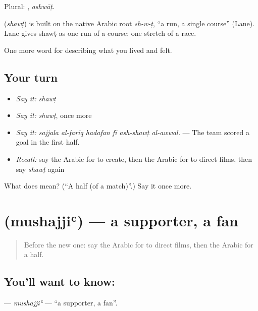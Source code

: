 Plural: , \emph{ashwāṭ}.

\begin{cousinweb}
\textbf{} (\emph{shawṭ}) is built on the native Arabic root \emph{sh-w-ṭ}, \textquotedblleft{}a run, a single course\textquotedblright{} (Lane). Lane gives shawṭ as one run of a course: one stretch of a race.
\end{cousinweb}

\begin{grammarlens}[title={What you've built}]
One more word for describing what you lived and felt.
\end{grammarlens}

\subsection*{Your turn}
\begin{itemize}
\raggedright
  \item \emph{Say it:} \emph{shawṭ}
  \item \emph{Say it:} \emph{shawṭ}, once more
  \item \emph{Say it:} \emph{sajjala al-farīq hadafan fī ash-shawṭ al-awwal.} — The team scored a goal in the first half.
  \item \emph{Recall:} say the Arabic for to create, then the Arabic for to direct films, then say \emph{shawṭ} again
\end{itemize}

\begin{tcolorbox}[breakable,colback=teal!4,colframe=teal!35!black,title={Before you move on}]
What does  mean? (\textquotedblleft{}A half (of a match)\textquotedblright{}.) Say it once more.
\end{tcolorbox}
\section[\texorpdfstring{\ar{مشجع} (mushajjiʿ)}{مشجع (mushajjiʿ)}]{ (mushajjiʿ) — a supporter, a fan}

\label{lesson:AR-C546-mushajji}



\begin{quote}
Before the new one: say the Arabic for to direct films, then the Arabic for a half.
\end{quote}

\subsection*{You'll want to know: }
\textbf{} — \emph{mushajjiʿ} — \textquotedblleft{}a supporter, a fan\textquotedblright{}.

